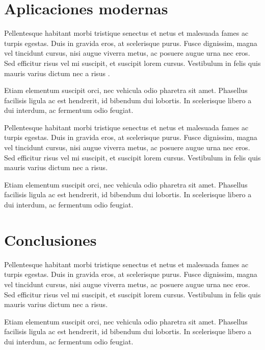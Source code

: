 \section{Aplicaciones modernas}

Pellentesque habitant morbi tristique senectus et netus et malesuada fames ac turpis egestas. Duis in gravida eros, at scelerisque purus. Fusce dignissim, magna vel tincidunt cursus, nisi augue viverra metus, ac posuere augue urna nec eros. Sed efficitur risus vel mi suscipit, et suscipit lorem cursus. Vestibulum in felis quis mauris varius dictum nec a risus \parencite{@6282-DIAMAND1984}.

Etiam elementum suscipit orci, nec vehicula odio pharetra sit amet. Phasellus facilisis ligula ac est hendrerit, id bibendum dui lobortis. In scelerisque libero a dui interdum, ac fermentum odio feugiat.

Pellentesque habitant morbi tristique senectus et netus et malesuada fames ac turpis egestas. Duis in gravida eros, at scelerisque purus. Fusce dignissim, magna vel tincidunt cursus, nisi augue viverra metus, ac posuere augue urna nec eros. Sed efficitur risus vel mi suscipit, et suscipit lorem cursus. Vestibulum in felis quis mauris varius dictum nec a risus.

Etiam elementum suscipit orci, nec vehicula odio pharetra sit amet. Phasellus facilisis ligula ac est hendrerit, id bibendum dui lobortis. In scelerisque libero a dui interdum, ac fermentum odio feugiat.

\section{Conclusiones}

Pellentesque habitant morbi tristique senectus et netus et malesuada fames ac turpis egestas. Duis in gravida eros, at scelerisque purus. Fusce dignissim, magna vel tincidunt cursus, nisi augue viverra metus, ac posuere augue urna nec eros. Sed efficitur risus vel mi suscipit, et suscipit lorem cursus. Vestibulum in felis quis mauris varius dictum nec a risus.

Etiam elementum suscipit orci, nec vehicula odio pharetra sit amet. Phasellus facilisis ligula ac est hendrerit, id bibendum dui lobortis. In scelerisque libero a dui interdum, ac fermentum odio feugiat.

